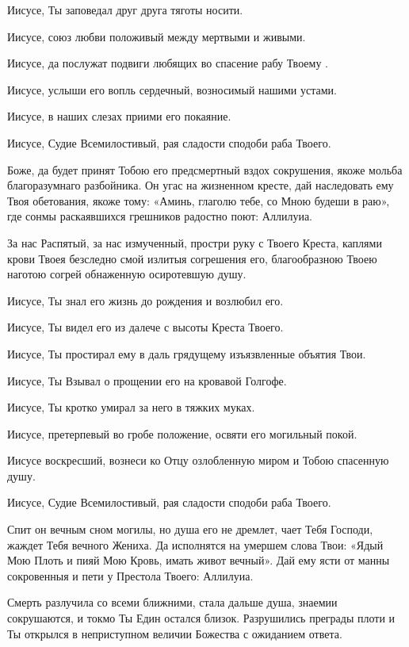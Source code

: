 \begin{mymulticols}
Иисусе, Ты заповедал друг друга тяготы носити. 

Иисусе, союз любви положивый между мертвыми и живыми. 

Иисусе, да послужат подвиги любящих во спасение рабу Твоему . 

Иисусе, услыши его вопль сердечный, возносимый нашими устами. 

Иисусе, в наших слезах приими его покаяние. 

Иисусе, Судие Всемилостивый, рая сладости сподоби раба Твоего.


Боже, да будет принят Тобою его предсмертный вздох сокрушения, якоже мольба благоразумнаго разбойника. Он угас на жизненном кресте, дай наследовать ему Твоя обетования, якоже тому: «Аминь, глаголю тебе, со Мною будеши в раю», где сонмы раскаявшихся грешников радостно поют: Аллилуиа.


За нас Распятый, за нас измученный, простри руку с Твоего Креста, каплями крови Твоея безследно смой излитыя согрешения его, благообразною Твоею наготою согрей обнаженную осиротевшую душу. 

Иисусе, Ты знал его жизнь до рождения и возлюбил его. 

Иисусе, Ты видел его из далече с высоты Креста Твоего. 

Иисусе, Ты простирал ему в даль грядущему изъязвленные объятия Твои. 

Иисусе, Ты Взывал о прощении его на кровавой Голгофе. 

Иисусе, Ты кротко умирал за него в тяжких муках. 

Иисусе, претерпевый во гробе положение, освяти его могильный покой. 

Иисусе воскресший, вознеси ко Отцу озлобленную миром и Тобою спасенную душу. 

Иисусе, Судие Всемилостивый, рая сладости сподоби раба Твоего.


Спит он вечным сном могилы, но душа его не дремлет, чает Тебя Господи, жаждет Тебя вечного Жениха. Да исполнятся на умершем слова Твои: «Ядый Мою Плоть и пияй Мою Кровь, имать живот вечный». Дай ему ясти от манны сокровенныя и пети у Престола Твоего: Аллилуиа.


Смерть разлучила со всеми ближними, стала дальше душа, знаемии сокрушаются, и токмо Ты Един остался близок. Разрушились преграды плоти и Ты открылся в неприступном величии Божества с ожиданием ответа. 


\end{mymulticols}

